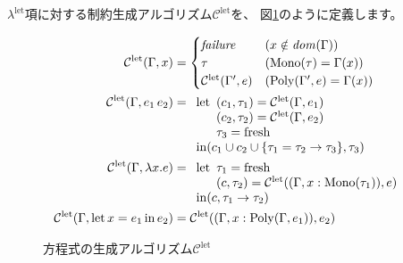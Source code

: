 $\lambda^\mathrm{let}$項に対する制約生成アルゴリズム$\mathcal C^\mathrm{let}$を、
図\ref{fig:algorithm-cp}のように定義します。

\begin{figure}[htbp]
  \begin{align*}
    \mathcal C^\mathrm{let}(\Gamma, x) &=
      \begin{cases}
        \mathit{failure}                    & (x \notin \mathit{dom}(\Gamma)) \\
        \tau                                & (\mathrm{Mono}(\tau) = \Gamma(x)) \\
        \mathcal C^\mathrm{let}(\Gamma', e) & (\mathrm{Poly}(\Gamma', e) = \Gamma(x)) \\
      \end{cases} \\
    \mathcal C^\mathrm{let}(\Gamma, e_1 \, e_2) &=
      \begin{array}[t]{l}
        \mathrm{let}
          \begin{array}[t]{l}
            (c_1, \tau_1) = \mathcal C^\mathrm{let}(\Gamma, e_1) \\
            (c_2, \tau_2) = \mathcal C^\mathrm{let}(\Gamma, e_2) \\
            \tau_3 = \mathrm{fresh}
          \end{array} \\
        \mathrm{in} (c_1 \cup c_2 \cup \{\tau_1 = \tau_2 \to \tau_3\}, \tau_3)
      \end{array} \\
    \mathcal C^\mathrm{let}(\Gamma, \lambda x . e) &=
      \begin{array}[t]{l}
        \mathrm{let}
          \begin{array}[t]{l}
            \tau_1 = \mathrm{fresh} \\
            (c, \tau_2) = \mathcal C^\mathrm{let}((\Gamma, x : \mathrm{Mono}(\tau_1)), e)
          \end{array} \\
        \mathrm{in} (c, \tau_1 \to \tau_2)
      \end{array} \\
    \mathcal C^\mathrm{let}(\Gamma, \mathrm{let} \, x = e_1 \, \mathrm{in} \, e_2) &=
      \mathcal C^\mathrm{let}((\Gamma, x : \mathrm{Poly}(\Gamma, e_1)), e_2)
  \end{align*}
  \caption{方程式の生成アルゴリズム$\mathcal C^\mathrm{let}$}
  \label{fig:algorithm-cp}
\end{figure}

